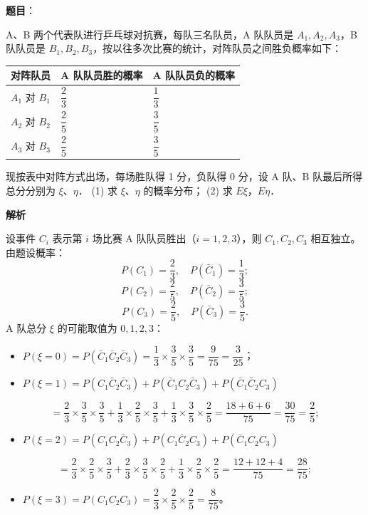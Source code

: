 \begin{answer}

\textbf{题目}：

A、B 两个代表队进行乒乓球对抗赛，每队三名队员，A 队队员是 $A_1, A_2, A_3$，B 队队员是 $B_1, B_2, B_3$，按以往多次比赛的统计，对阵队员之间胜负概率如下：

\begin{center}
\begin{tabular}{lll}
\toprule
对阵队员 & A 队队员胜的概率 & A 队队员负的概率 \\
\midrule
$A_1$ 对 $B_1$ & $\dfrac{2}{3}$ & $\dfrac{1}{3}$ \\
$A_2$ 对 $B_2$ & $\dfrac{2}{5}$ & $\dfrac{3}{5}$ \\
$A_3$ 对 $B_3$ & $\dfrac{2}{5}$ & $\dfrac{3}{5}$ \\
\bottomrule
\end{tabular}
\end{center}

现按表中对阵方式出场，每场胜队得 1 分，负队得 0 分，设 A 队、B 队最后所得总分分别为 $\xi$、$\eta$．
(1) 求 $\xi$、$\eta$ 的概率分布；
(2) 求 $E\xi$，$E\eta$．

\textbf{解析}


设事件 $C_i$ 表示第 $i$ 场比赛 A 队队员胜出（$i = 1, 2, 3$），则 $C_1, C_2, C_3$ 相互独立。
由题设概率：
\nopagebreak[4]
\[P(C_1) = \frac{2}{3}, \quad P(\bar{C}_1) = \frac{1}{3};\]
\nopagebreak[4]
\[P(C_2) = \frac{2}{5}, \quad P(\bar{C}_2) = \frac{3}{5};\]
\nopagebreak[4]
\[P(C_3) = \frac{2}{5}, \quad P(\bar{C}_3) = \frac{3}{5}.\]
A 队总分 $\xi$ 的可能取值为 $0, 1, 2, 3$：
\begin{itemize}
\item $P(\xi = 0) = P(\bar{C}_1 \bar{C}_2 \bar{C}_3) = \dfrac{1}{3} \times \dfrac{3}{5} \times \dfrac{3}{5} = \dfrac{9}{75} = \dfrac{3}{25}$；
\item $P(\xi = 1) = P(C_1 \bar{C}_2 \bar{C}_3) + P(\bar{C}_1 C_2 \bar{C}_3) + P(\bar{C}_1 \bar{C}_2 C_3)$
\end{itemize}
\nopagebreak[4]
\[= \frac{2}{3} \times \frac{3}{5} \times \frac{3}{5} + \frac{1}{3} \times \frac{2}{5} \times \frac{3}{5} + \frac{1}{3} \times \frac{3}{5} \times \frac{2}{5} = \frac{18 + 6 + 6}{75} = \frac{30}{75} = \frac{2}{5};\]
\begin{itemize}
\item $P(\xi = 2) = P(C_1 C_2 \bar{C}_3) + P(C_1 \bar{C}_2 C_3) + P(\bar{C}_1 C_2 C_3)$
\end{itemize}
\nopagebreak[4]
\[= \frac{2}{3} \times \frac{2}{5} \times \frac{3}{5} + \frac{2}{3} \times \frac{3}{5} \times \frac{2}{5} + \frac{1}{3} \times \frac{2}{5} \times \frac{2}{5} = \frac{12 + 12 + 4}{75} = \frac{28}{75};\]
\begin{itemize}
\item $P(\xi = 3) = P(C_1 C_2 C_3) = \dfrac{2}{3} \times \dfrac{2}{5} \times \dfrac{2}{5} = \dfrac{8}{75}$。
\end{itemize}


\end{answer}
